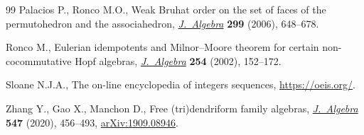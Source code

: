 \begin{thebibliography}{99}
Palacios P., Ronco M.O., Weak {B}ruhat order on the set of faces of the
 permutohedron and the associahedron, \href{https://doi.org/10.1016/j.jalgebra.2005.09.042}{\textit{J.~Algebra}} \textbf{299} (2006),
 648--678.

Ronco M., Eulerian idempotents and {M}ilnor--{M}oore theorem for certain
 non-cocommutative {H}opf algebras, \href{https://doi.org/10.1016/S0021-8693(02)00097-2}{\textit{J.~Algebra}} \textbf{254} (2002),
 152--172.

Sloane N.J.A., The on-line encyclopedia of integers sequences,
 \url{https://oeis.org/}.

Zhang Y., Gao X., Manchon D., Free (tri)dendriform family algebras,
 \href{https://doi.org/10.1016/j.jalgebra.2019.11.027}{\textit{J.~Algebra}} \textbf{547} (2020), 456--493, \href{https://arxiv.org/abs/1909.08946}{arXiv:1909.08946}.

\end{thebibliography}
